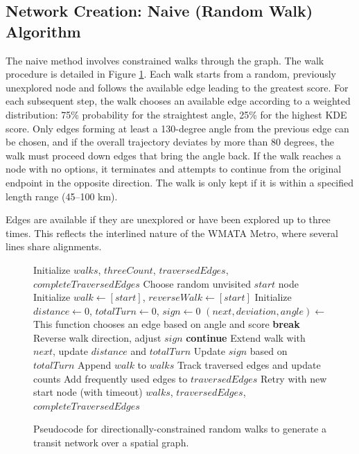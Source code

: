 \documentclass[sigconf,nonacm]{acmart}
\begin{document}
\subsection{Network Creation: Naive (Random Walk) Algorithm}

The naive method involves constrained walks through the graph. The walk procedure is detailed in Figure \ref{fig:perform_walks_pseudocode}. Each walk starts from a random, previously unexplored node and follows the available edge leading to the greatest score. For each subsequent step, the walk chooses an available edge according to a weighted distribution: 75\% probability for the straightest angle, 25\% for the highest KDE score. Only edges forming at least a 130-degree angle from the previous edge can be chosen, and if the overall trajectory deviates by more than 80 degrees, the walk must proceed down edges that bring the angle back. If the walk reaches a node with no options, it terminates and attempts to continue from the original endpoint in the opposite direction. The walk is only kept if it is within a specified length range (45--100 km).

Edges are available if they are unexplored or have been explored up to three times. This reflects the interlined nature of the WMATA Metro, where several lines share alignments.

\begin{figure}[h]
\centering
\begin{minipage}{1\linewidth}
\begin{algorithmic}
    \State Initialize $walks$, $threeCount$, $traversedEdges$, $completeTraversedEdges$
        \State Choose random unvisited $start$ node
        \State Initialize $walk \gets [start]$, $reverseWalk \gets [start]$
        \State Initialize $distance \gets 0$, $totalTurn \gets 0$, $sign \gets 0$
            \State $(next, deviation, angle) \gets$  \State This function chooses an edge based on angle and score
                \State \textbf{break}
                \State Reverse walk direction, adjust $sign$
                \State \textbf{continue}
            \EndIf
            \State Extend walk with $next$, update $distance$ and $totalTurn$
            \State Update $sign$ based on $totalTurn$
        \EndWhile
            \State Append $walk$ to $walks$
            \State Track traversed edges and update counts
            \State Add frequently used edges to $traversedEdges$
        \Else
            \State Retry with new start node (with timeout)
        \EndIf
    \EndFor
    \State \Return $walks$, $traversedEdges$, $completeTraversedEdges$
\EndFunction
\end{algorithmic}
\caption{Pseudocode for directionally-constrained random walks to generate a transit network over a spatial graph.}
\label{fig:perform_walks_pseudocode}
\end{minipage}
\end{figure}
\end{document}
